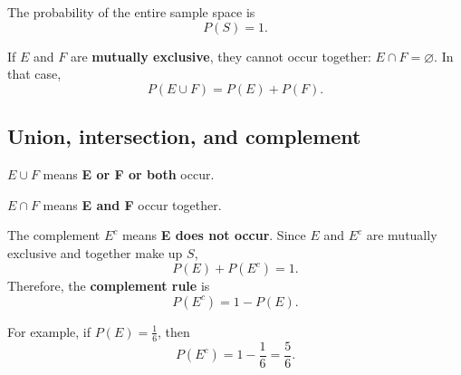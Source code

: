 \documentclass[11pt]{article}
\begin{document}
The probability of the entire sample space is
\[
P(S)=1.
\]

If $E$ and $F$ are \textbf{mutually exclusive}, they cannot occur
together: $E\cap F=\varnothing$. In that case,
\[
P(E\cup F)=P(E)+P(F).
\]

\subsection{Union, intersection, and complement}

$E\cup F$ means \textbf{E or F or both} occur.

$E\cap F$ means \textbf{E and F} occur together.

The complement $E^c$ means \textbf{E does not occur}. Since $E$
and $E^c$ are mutually exclusive and together make up $S$,
\[
P(E)+P(E^c)=1.
\]
Therefore, the \textbf{complement rule} is
\[
\boxed{P(E^c)=1-P(E)}.
\]

For example, if $P(E)=\frac16$, then
\[
P(E^c)=1-\frac16=\frac56.
\]
\end{document}
